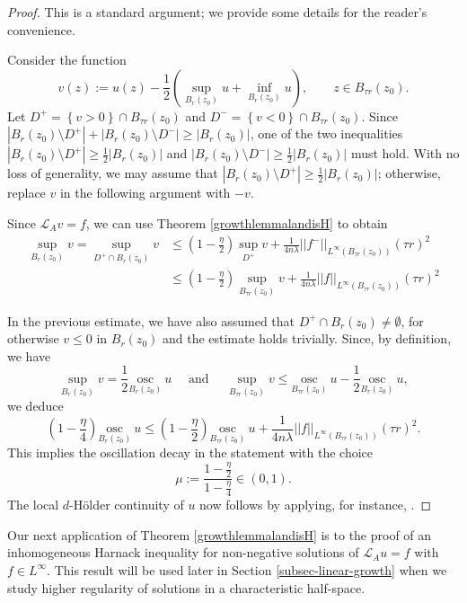 \documentclass[12pt]{amsart}
\newcommand{\osc}{\mathrm{osc}}
\def \L {\mathcal{L}}
\def \t {\tau}
\begin{document}
\begin{proof}
This is a standard argument; we provide some details for the reader's convenience.

Consider the function
$$v(z) := u(z) - \frac{1}{2}\left(\sup_{B_r(z_0)} u + \inf_{B_r(z_0)} u \right), \qquad z \in B_{\t r}(z_0).$$
Let $D^+ = \left\{v > 0 \right\} \cap B_{\t r}(z_0)$ and $D^- = \left\{v < 0 \right\} \cap B_{\t r}(z_0)$. Since $|B_r(z_0) \setminus D^+|+|B_r(z_0) \setminus D^-|\geq |B_r(z_0)|$, one of the two inequalities $|B_r(z_0) \setminus D^+| \geq \frac{1}{2}|B_r(z_0)|$ and $|B_r(z_0) \setminus D^-| \geq \frac{1}{2}|B_r(z_0)|$ must hold. With no loss of generality, we may assume that $|B_r(z_0) \setminus D^+| \geq \frac{1}{2}|B_r(z_0)|$; otherwise, replace $v$ in the following argument with $-v$. 

Since $\L_A v = f$, we can use Theorem \ref{growthlemmalandisH} to obtain
\begin{align*}
\sup_{B_r(z_0)} v= \sup_{D^+ \cap B_r(z_0)} v &\leq \left(1-\frac{\eta}{2}\right)\sup_{D^+} v + \frac{1}{4n\lambda} ||f^-||_{L^{\infty}(B_{\t r}(z_0))} (\tau r)^2 \\
&\leq \left(1-\frac{\eta}{2}\right)\sup_{B_{\t r}(z_0)} v + \frac{1}{4n\lambda} ||f||_{L^{\infty}(B_{\t r}(z_0))} (\tau r)^2
\end{align*}

In the previous estimate, we have also assumed that $D^+\cap B_r(z_0)\neq\emptyset$, for otherwise $v\leq 0$ in $B_r(z_0)$ and the estimate holds trivially. Since, by definition, we have
$$
\sup_{B_r(z_0)} v  = \frac{1}{2} \underset{B_r(z_0)}{\osc} \ u\quad\mbox{ and }\quad
\sup\limits_{B_{\t r}(z_0)} v\leq \underset{B_{\t r}(z_0)}{\osc} \ u - \frac{1}{2} \underset{B_r(z_0)}{\osc} \ u,
$$
we deduce
$$
\left(1-\frac{\eta}{4}\right) \underset{B_r(z_0)}{\osc} \ u \leq  \left(1-\frac{\eta}{2}\right) 
\underset{B_{\t r}(z_0)}{\osc} \ u  + \frac{1}{4n\lambda} ||f||_{L^{\infty}(B_{\t r}(z_0))} (\tau r)^2.
$$
This implies the oscillation decay in the statement with the choice
$$\mu := \frac{1 - \frac{\eta}{2}}{1 - \frac{\eta}{4}} \in (0,1).$$ 
The local $d$-H\"older continuity of $u$ now follows by applying, for instance, \cite[Lemma 8.23]{GTBook}. \end{proof}

Our next application of Theorem \ref{growthlemmalandisH} is to the proof of an inhomogeneous Harnack inequality for non-negative solutions of $\L_A u = f$ with $f \in L^{\infty}$. This result will be used later in Section \ref{subsec-linear-growth} when we study higher regularity of solutions in a characteristic half-space.
\end{document}
